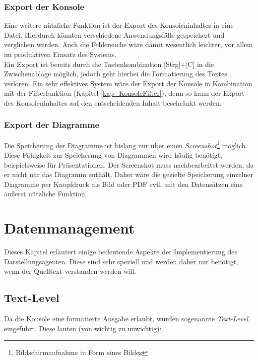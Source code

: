 \documentclass[a4paper,12pt,oneside,openright,onecolumn,final,titlepage,fleqn,ngerman]{scrreprt}
\newcommand{\repag}{Darstellungsagent}
\begin{document}
	\subsection{Export der Konsole}
	Eine weitere nützliche Funktion ist der Export des Konsoleninhaltes in eine Datei. Hierdurch könnten verschiedene Anwendungsfälle gespeichert und verglichen werden. Auch die Fehlersuche wäre damit wesentlich leichter, vor allem im produktiven Einsatz des Systems.\\
	Ein Export ist bereits durch die Tastenkombination [Strg]+[C] in die Zwischenablage möglich, jedoch geht hierbei die Formatierung des Textes verloren. Ein sehr effektives System wäre der Export der Konsole in Kombination mit der Filterfunktion (Kapitel \ref{kap_KonsoleFilter}), denn so kann der Export des Konsoleninhaltes auf den entscheidenden Inhalt beschränkt werden.
	
	\subsection{Export der Diagramme}
	Die Speicherung der Diagramme ist bislang nur über einen \emph{Screenshot}\footnote{Bildschirmaufnahme in Form eines Bildes} möglich. Diese Fähigkeit zur Speicherung von Diagrammen wird häufig benötigt, beispielsweise für Präsentationen. Der Screenshot muss nachbearbeitet werden, da er nicht nur das Diagramm enthält. Daher wäre die gezielte Speicherung einzelner Diagramme per Knopfdruck als Bild oder PDF evtl. mit den Datensätzen eine äußerst nützliche Funktion.

	\appendix
	\chapter{Datenmanagement}
	Dieses Kapitel erläutert einige bedeutende Aspekte der Implementierung des \repag{}en. Diese sind sehr speziell und werden daher nur benötigt, wenn der Quelltext verstanden werden will.
	
	\section{Text-Level}\label{kap_textlevels}
	Da die Konsole eine formatierte Ausgabe erlaubt, wurden sogenannte \emph{Text-Level} eingeführt. Diese lauten (von wichtig zu unwichtig):
	
\end{document}
